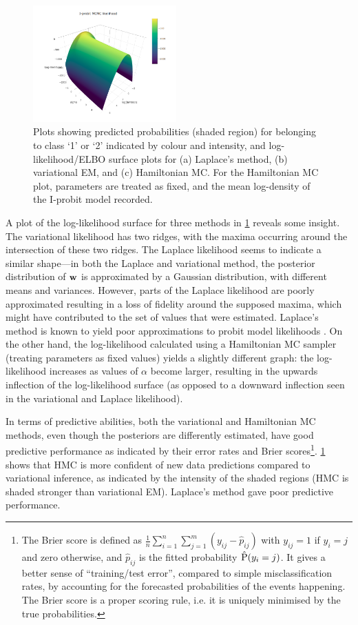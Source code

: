 \begin{figure}[p]
  \includegraphics[width=0.49\textwidth]{figure/05-lik_hmc}
  \caption[Predicted probabilities and log-density plots]{Plots showing predicted probabilities (shaded region) for belonging to class `1' or `2' indicated by colour and intensity, and log-likelihood/ELBO surface plots for (a) Laplace's method, (b) variational EM, and (c) Hamiltonian MC. For the Hamiltonian MC plot, parameters are treated as fixed, and the mean log-density of the I-probit model recorded.}
  \label{fig:exampleiprobitfit}
\end{figure}

A plot of the log-likelihood surface for three methods in \cref{fig:exampleiprobitfit} reveals some insight.
The variational likelihood has two ridges, with the maxima occurring around the intersection of these two ridges.
The Laplace likelihood seems to indicate a similar shape---in both the Laplace and variational method, the posterior distribution of ${\mathbf w}$ is approximated by a Gaussian distribution, with different means and variances.
However, parts of the Laplace likelihood are poorly approximated resulting in a loss of fidelity around the supposed maxima, which might have contributed to the set of values that were estimated.
Laplace's method is known to yield poor approximations to probit model likelihoods \citep{kuss2005assessing}.
On the other hand, the log-likelihood calculated using a Hamiltonian MC sampler (treating parameters as fixed values) yields a slightly different graph: the log-likelihood increases as values of $\alpha$ become larger, resulting in the upwards inflection of the log-likelihood surface (as opposed to a downward inflection seen in the variational and Laplace likelihood).

In terms of predictive abilities, both the variational and Hamiltonian MC methods, even though the posteriors are differently estimated, have good predictive performance as indicated by their error rates and Brier scores\footnote{The Brier score is defined as $\frac{1}{n}\sum_{i=1}^n\sum_{j=1}^m (y_{ij} - \hat p_{ij})$ with $y_{ij}=1$ if $y_i = j$ and zero otherwise, and $\hat p_{ij}$ is the fitted probability $\hat{\operatorname{P}}(y_i = j)$. It gives a better sense of ``training/test error'', compared to simple misclassification rates, by accounting for the forecasted probabilities of the events happening. The Brier score is a proper scoring rule, i.e. it is uniquely minimised by the true probabilities.}.
\cref{fig:exampleiprobitfit} shows that HMC is more confident of new data predictions compared to variational inference, as indicated by the intensity of the shaded regions (HMC is shaded stronger than variational EM).
Laplace's method gave poor predictive performance.

